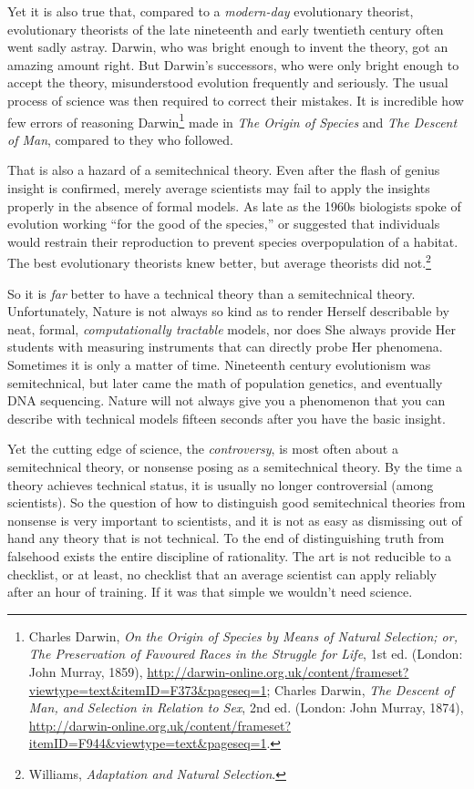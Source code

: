 {
 Yet it is also true that, compared to a \textit{modern-day}
evolutionary theorist, evolutionary theorists of the late nineteenth
and early twentieth century often went sadly astray. Darwin, who was
bright enough to invent the theory, got an amazing amount right. But
Darwin's successors, who were only bright enough to
accept the theory, misunderstood evolution frequently and seriously.
The usual process of science was then required to correct their
mistakes. It is incredible how few errors of reasoning
Darwin\footnote{Charles Darwin, \textit{On the Origin of Species by Means of
Natural Selection; or, The Preservation of Favoured Races in the
Struggle for Life}, 1st ed. (London: John Murray, 1859),
\url{http://darwin-online.org.uk/content/frameset?viewtype=text\&itemID=F373\&pageseq=1};
Charles Darwin, \textit{The Descent of Man, and Selection in Relation
to Sex}, 2nd ed. (London: John Murray, 1874),
\url{http://darwin-online.org.uk/content/frameset?itemID=F944\&viewtype=text\&pageseq=1}.} made in \textit{The Origin of Species} and
\textit{The Descent of Man}, compared to they who followed.}

{
 That is also a hazard of a semitechnical theory. Even after the
flash of genius insight is confirmed, merely average scientists may
fail to apply the insights properly in the absence of formal models. As
late as the 1960s biologists spoke of evolution working
``for the good of the species,'' or
suggested that individuals would restrain their reproduction to prevent
species overpopulation of a habitat. The best evolutionary theorists
knew better, but average theorists did not.\footnote{Williams, \textit{Adaptation and Natural Selection}.}}

{
 So it is \textit{far} better to have a technical theory than a
semitechnical theory. Unfortunately, Nature is not always so kind as to
render Herself describable by neat, formal, \textit{computationally
tractable} models, nor does She always provide Her students with
measuring instruments that can directly probe Her phenomena. Sometimes
it is only a matter of time. Nineteenth century evolutionism was
semitechnical, but later came the math of population genetics, and
eventually DNA sequencing. Nature will not always give you a phenomenon
that you can describe with technical models fifteen seconds after you
have the basic insight.}

{
 Yet the cutting edge of science, the \textit{controversy}, is most
often about a semitechnical theory, or nonsense posing as a
semitechnical theory. By the time a theory achieves technical status,
it is usually no longer controversial (among scientists). So the
question of how to distinguish good semitechnical theories from
nonsense is very important to scientists, and it is not as easy as
dismissing out of hand any theory that is not technical. To the end of
distinguishing truth from falsehood exists the entire discipline of
rationality. The art is not reducible to a checklist, or at least, no
checklist that an average scientist can apply reliably after an hour of
training. If it was that simple we wouldn't need
science.}

